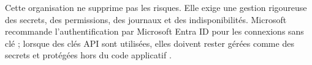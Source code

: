 Cette organisation ne supprime pas les risques. Elle exige une gestion rigoureuse des secrets, des permissions, des journaux et des indisponibilités. Microsoft recommande l'authentification par Microsoft Entra ID pour les connexions sans clé ; lorsque des clés API sont utilisées, elles doivent rester gérées comme des secrets et protégées hors du code applicatif \cite{azure-entra-auth,azure-key-vault-secrets}.
